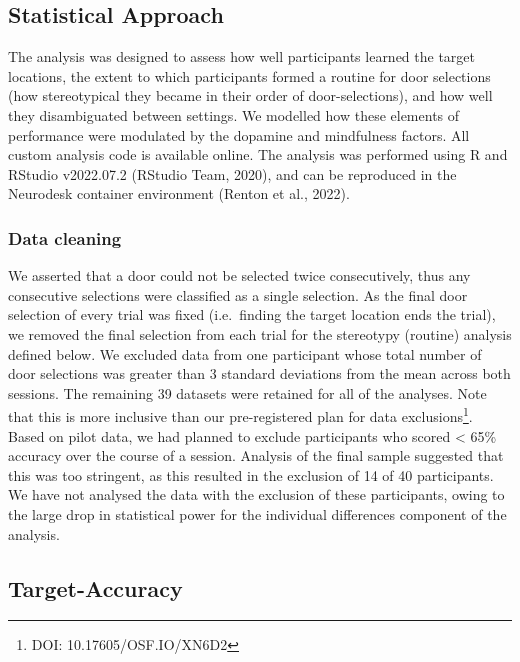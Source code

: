 \documentclass[
  man]{apa6}
\begin{document}
\hypertarget{statistical-approach}{%
\subsection{Statistical Approach}\label{statistical-approach}}

\label{sec:Statistical Approach}

The analysis was designed to assess how well participants learned the target locations, the extent to which participants formed a routine for door selections (how stereotypical they became in their order of door-selections), and how well they disambiguated between settings. We modelled how these elements of performance were modulated by the dopamine and mindfulness factors. All custom analysis code is available online. The analysis was performed using R and RStudio v2022.07.2 (RStudio Team, 2020), and can be reproduced in the Neurodesk container environment (Renton et al., 2022).

\hypertarget{data-cleaning}{%
\subsubsection{Data cleaning}\label{data-cleaning}}

\label{sec:Data cleaning}

We asserted that a door could not be selected twice consecutively, thus any consecutive selections were classified as a single selection. As the final door selection of every trial was fixed (i.e.~finding the target location ends the trial), we removed the final selection from each trial for the stereotypy (routine) analysis defined below. We excluded data from one participant whose total number of door selections was greater than 3 standard deviations from the mean across both sessions. The remaining 39 datasets were retained for all of the analyses. Note that this is more inclusive than our pre-registered plan for data exclusions\footnote{DOI: 10.17605/OSF.IO/XN6D2}. Based on pilot data, we had planned to exclude participants who scored \textless{} 65\% accuracy over the course of a session. Analysis of the final sample suggested that this was too stringent, as this resulted in the exclusion of 14 of 40 participants. We have not analysed the data with the exclusion of these participants, owing to the large drop in statistical power for the individual differences component of the analysis.

\hypertarget{target-accuracy}{%
\subsection{Target-Accuracy}\label{target-accuracy}}
\end{document}
